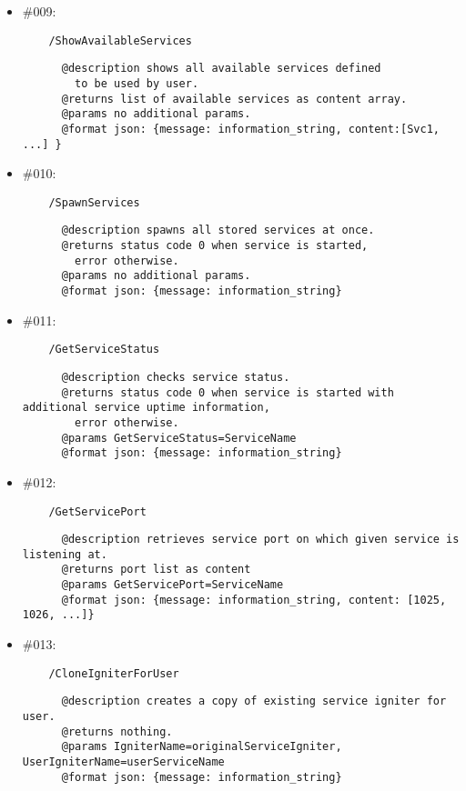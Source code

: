 \documentclass[11pt,a4paper]{scrartcl}
\begin{document}
\begin{itemize}
    \item \#009:
      \begin{verbatim}
    /ShowAvailableServices
      \end{verbatim}
      \begin{verbatim}
      @description shows all available services defined
        to be used by user.
      @returns list of available services as content array.
      @params no additional params.
      @format json: {message: information_string, content:[Svc1, ...] }
      \end{verbatim}

    \item \#010:
      \begin{verbatim}
    /SpawnServices
      \end{verbatim}
      \begin{verbatim}
      @description spawns all stored services at once.
      @returns status code 0 when service is started,
        error otherwise.
      @params no additional params.
      @format json: {message: information_string}
      \end{verbatim}

    \item \#011:
      \begin{verbatim}
    /GetServiceStatus
      \end{verbatim}
      \begin{verbatim}
      @description checks service status.
      @returns status code 0 when service is started with additional service uptime information,
        error otherwise.
      @params GetServiceStatus=ServiceName
      @format json: {message: information_string}
      \end{verbatim}

    \item \#012:
      \begin{verbatim}
    /GetServicePort
      \end{verbatim}
      \begin{verbatim}
      @description retrieves service port on which given service is listening at.
      @returns port list as content
      @params GetServicePort=ServiceName
      @format json: {message: information_string, content: [1025, 1026, ...]}
      \end{verbatim}

    \item \#013:
      \begin{verbatim}
    /CloneIgniterForUser
      \end{verbatim}
      \begin{verbatim}
      @description creates a copy of existing service igniter for user.
      @returns nothing.
      @params IgniterName=originalServiceIgniter, UserIgniterName=userServiceName
      @format json: {message: information_string}
      \end{verbatim}


\end{itemize}
\end{document}
